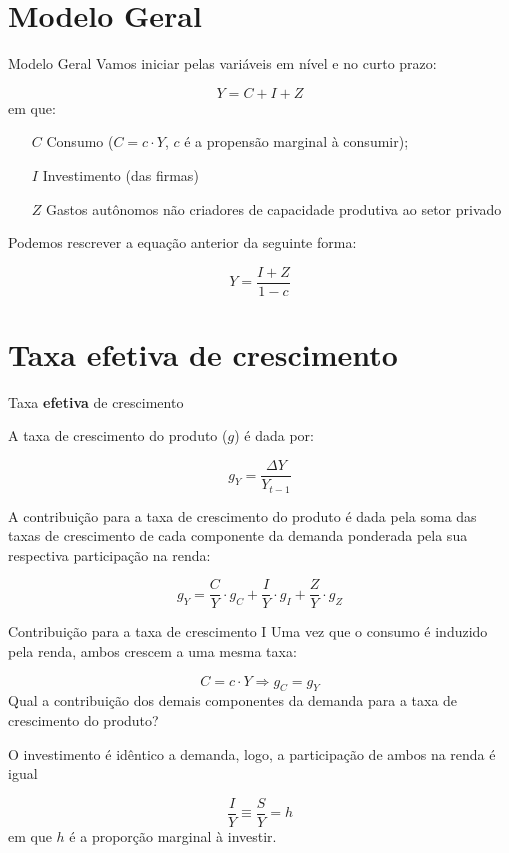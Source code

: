 \documentclass[10pt]{beamer}
\begin{document}
\section{Modelo Geral}

\begin{frame}{Modelo Geral}
Vamos iniciar pelas variáveis em nível e no curto prazo:

$$
Y = C + I + Z
$$
em que:
\begin{itemize}
	\item[$C$] Consumo ($C = c\cdot Y$, $c$ é a propensão marginal à consumir);
	\item[$I$] Investimento (das firmas)
	\item[$Z$] Gastos autônomos não criadores de capacidade produtiva ao setor privado 
\end{itemize}
Podemos rescrever a equação anterior da seguinte forma:

$$
Y = \frac{I + Z}{1-c}
$$

\end{frame}

\section{Taxa efetiva de crescimento}

\begin{frame}{Taxa \textbf{efetiva} de crescimento}

A taxa de crescimento do produto ($g$) é dada por:

$$
g_Y = \frac{\Delta Y}{Y_{t-1}}
$$

A contribuição para a taxa de crescimento do produto é dada pela soma das taxas de crescimento de cada componente da demanda ponderada pela sua respectiva participação na renda:

$$
g_Y = \frac{C}{Y}\cdot g_C + \frac{I}{Y}\cdot g_I + \frac{Z}{Y}\cdot g_Z
$$
\end{frame}

\begin{frame}{Contribuição para a taxa de crescimento I}
Uma vez que o consumo é induzido pela renda, ambos crescem a uma mesma taxa:

$$
C = c\cdot Y \Rightarrow g_C = g_Y
$$
Qual a contribuição dos demais componentes da demanda para a taxa de crescimento do produto?

O investimento é idêntico a demanda, logo, a participação de ambos na renda é igual

$$
\frac{I}{Y} \equiv \frac{S}{Y} = h
$$	
em que $h$ é a proporção marginal à investir. 

\end{frame}
\end{document}
